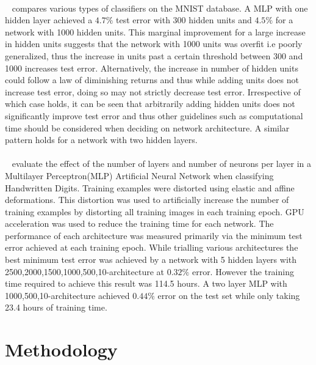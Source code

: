 \documentclass{article}
\begin{document}
 \paragraph{} ~\citet{lecun1998gradient} compares various types of classifiers on the MNIST database. A MLP with one hidden layer achieved a $4.7\%$ test error with 300 hidden units and $4.5\%$ for a network with 1000 hidden units. This marginal improvement for a large increase in hidden units suggests that the network with 1000 units was overfit i.e poorly generalized, thus the increase in units past a certain threshold between 300 and 1000 increases test error. Alternatively, the increase in number of hidden units could follow a law of diminishing returns and thus while adding units does not increase test error, doing so may not strictly decrease test error. Irrespective of which case holds, it can be seen that arbitrarily adding hidden units does not significantly improve test error and thus other guidelines such as computational time should be considered when deciding on network architecture. A similar pattern holds for a network with two hidden layers.
 
 \paragraph{}~\citet{deepsimpleMLP} evaluate the effect of the number of layers and number of neurons per layer in a Multilayer Perceptron(MLP) Artificial Neural Network when classifying Handwritten Digits. Training examples were distorted using elastic and affine deformations. This distortion was used to artificially increase the number of training examples by distorting all training images in each training epoch. GPU acceleration was used to reduce the training time for each network. The performance of each architecture was measured primarily via the minimum test error achieved at each training epoch. While trialling various architectures the best minimum test error was achieved by a network with 5 hidden layers with 2500,2000,1500,1000,500,10-architecture at $0.32\%$ error. However the training time required to achieve this result was 114.5 hours. A two layer MLP with 1000,500,10-architecture achieved $0.44\%$ error on the test set while only taking 23.4 hours of training time. 
 
 
 

  
\section{Methodology}
\end{document}
